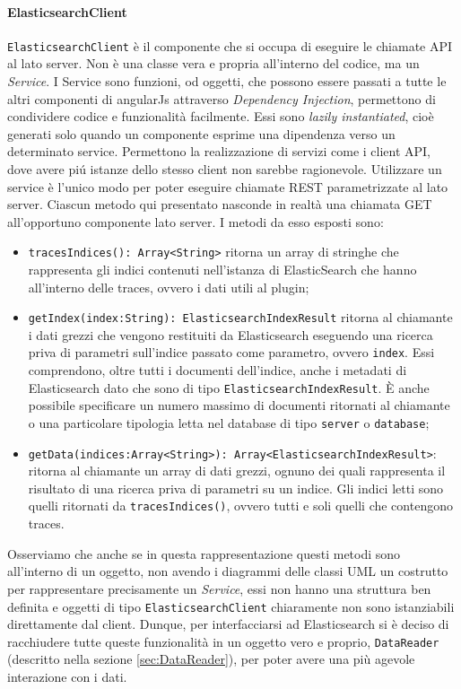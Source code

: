 \paragraph{ElasticsearchClient} \Spazio
\texttt{ElasticsearchClient} è il componente che si occupa di eseguire le chiamate API al lato server. Non è una classe vera e propria all'interno del codice, ma un \emph{Service}. 
I Service sono funzioni, od oggetti, che possono essere passati a tutte le altri componenti di angularJs attraverso \emph{Dependency Injection}, permettono di condividere codice e funzionalità facilmente. Essi sono \emph{lazily instantiated}, cioè generati solo quando un componente esprime una dipendenza verso un determinato service. Permettono la realizzazione di servizi come i client API, dove avere piú istanze dello stesso client non sarebbe ragionevole. 
Utilizzare un service è l'unico modo per poter eseguire chiamate REST parametrizzate al lato server. Ciascun metodo qui presentato nasconde in realtà una chiamata GET all'opportuno componente lato server. I metodi da esso esposti sono: 
\begin{itemize} 
  \item \texttt{tracesIndices(): Array<String>} ritorna un array di stringhe che rappresenta gli indici contenuti nell'istanza di ElasticSearch che hanno all'interno delle traces, ovvero i dati utili al plugin; 
  \item \texttt{getIndex(index:String): ElasticsearchIndexResult} ritorna al chiamante i dati grezzi che vengono restituiti da Elasticsearch eseguendo una ricerca priva di parametri sull'indice passato come parametro, ovvero \texttt{index}. Essi comprendono, oltre tutti i documenti dell'indice, anche i metadati di Elasticsearch dato che sono di tipo \texttt{ElasticsearchIndexResult}. È anche possibile specificare un numero massimo di documenti ritornati al chiamante o una particolare tipologia letta nel database di tipo \texttt{server} o \texttt{database}; 
  \item \texttt{getData(indices:Array<String>): Array<ElasticsearchIndexResult>}: ritorna al chiamante un array di dati grezzi, ognuno dei quali rappresenta il risultato di una ricerca priva di parametri su un indice. Gli indici letti sono quelli ritornati da \texttt{tracesIndices()}, ovvero tutti e soli quelli che contengono traces. 
\end{itemize} 
Osserviamo che anche se in questa rappresentazione questi metodi sono all'interno di un oggetto, non avendo i diagrammi delle classi UML un costrutto per rappresentare precisamente un \emph{Service}, essi non hanno una struttura ben definita e oggetti di tipo \texttt{ElasticsearchClient} chiaramente non sono istanziabili direttamente dal client. Dunque, per interfacciarsi ad Elasticsearch si è deciso di racchiudere tutte queste funzionalità in un oggetto vero e proprio, \texttt{DataReader} (descritto nella sezione \ref{sec:DataReader}), per poter avere una più agevole interazione con i dati. 

